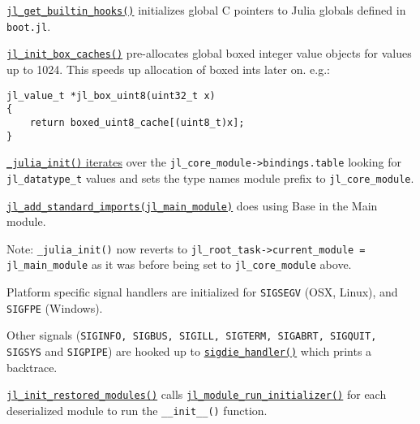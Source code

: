 \href{https://github.com/JuliaLang/julia/blob/master/src/init.c}{\texttt{jl\_get\_builtin\_hooks()}} initializes global C pointers to Julia globals defined in \texttt{boot.jl}.



\href{https://github.com/JuliaLang/julia/blob/master/src/datatype.c}{\texttt{jl\_init\_box\_caches()}} pre-allocates global boxed integer value objects for values up to 1024. This speeds up allocation of boxed ints later on. e.g.:




\begin{lstlisting}
jl_value_t *jl_box_uint8(uint32_t x)
{
    return boxed_uint8_cache[(uint8_t)x];
}
\end{lstlisting}



\href{https://github.com/JuliaLang/julia/blob/master/src/init.c}{\texttt{\_julia\_init()} iterates} over the \texttt{jl\_core\_module->bindings.table} looking for \texttt{jl\_datatype\_t} values and sets the type name{\textquotesingle}s module prefix to \texttt{jl\_core\_module}.



\href{https://github.com/JuliaLang/julia/blob/master/src/toplevel.c}{\texttt{jl\_add\_standard\_imports(jl\_main\_module)}} does {\textquotedbl}using Base{\textquotedbl} in the {\textquotedbl}Main{\textquotedbl} module.



Note: \texttt{\_julia\_init()} now reverts to \texttt{jl\_root\_task->current\_module = jl\_main\_module} as it was before being set to \texttt{jl\_core\_module} above.



Platform specific signal handlers are initialized for \texttt{SIGSEGV} (OSX, Linux), and \texttt{SIGFPE} (Windows).



Other signals (\texttt{SIGINFO, SIGBUS, SIGILL, SIGTERM, SIGABRT, SIGQUIT, SIGSYS} and \texttt{SIGPIPE}) are hooked up to \href{https://github.com/JuliaLang/julia/blob/master/src/signals-unix.c}{\texttt{sigdie\_handler()}} which prints a backtrace.



\href{https://github.com/JuliaLang/julia/blob/master/src/staticdata.c}{\texttt{jl\_init\_restored\_modules()}} calls \href{https://github.com/JuliaLang/julia/blob/master/src/module.c}{\texttt{jl\_module\_run\_initializer()}} for each deserialized module to run the \texttt{\_\_init\_\_()} function.



